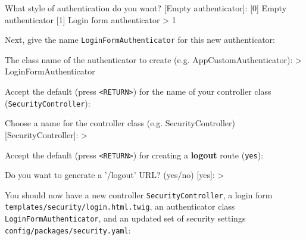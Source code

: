 \documentclass[a4paperpaper,openright]{book}
\newenvironment{Shaded}{}{}
\newcommand{\BuiltInTok}[1]{#1}
\newcommand{\ExtensionTok}[1]{#1}
\newcommand{\NormalTok}[1]{#1}
\newcommand{\OperatorTok}[1]{\textcolor[rgb]{0.40,0.40,0.40}{#1}}
\newcommand{\StringTok}[1]{\textcolor[rgb]{0.25,0.44,0.63}{#1}}
\begin{document}
\begin{Shaded}
\begin{Highlighting}[]
    \ExtensionTok{What}\NormalTok{ style of authentication do you want? [Empty authenticator]:}
\NormalTok{    [}\ExtensionTok{0}\NormalTok{] Empty authenticator}
\NormalTok{    [}\ExtensionTok{1}\NormalTok{] Login form authenticator}
    \OperatorTok{>} \ExtensionTok{1}
\end{Highlighting}
\end{Shaded}

Next, give the name \texttt{LoginFormAuthenticator} for this new
authenticator:

\begin{Shaded}
\begin{Highlighting}[]
    \ExtensionTok{The}\NormalTok{ class name of the authenticator to create (e.g. AppCustomAuthenticator)}\BuiltInTok{:}
    \OperatorTok{>} \ExtensionTok{LoginFormAuthenticator}
\end{Highlighting}
\end{Shaded}

Accept the default (press \texttt{\textless{}RETURN\textgreater{}}) for
the name of your controller class (\texttt{SecurityController}):

\begin{Shaded}
\begin{Highlighting}[]
     \ExtensionTok{Choose}\NormalTok{ a name for the controller class (e.g. SecurityController) [}\ExtensionTok{SecurityController}\NormalTok{]:}
     \OperatorTok{>} 
\end{Highlighting}
\end{Shaded}

Accept the default (press \texttt{\textless{}RETURN\textgreater{}}) for
creating a \textbf{logout} route (\texttt{yes}):

\begin{Shaded}
\begin{Highlighting}[]
     \ExtensionTok{Do}\NormalTok{ you want to generate a }\StringTok{'/logout'}\NormalTok{ URL? (yes/no) [}\ExtensionTok{yes}\NormalTok{]:}
     \OperatorTok{>} 
\end{Highlighting}
\end{Shaded}

You should now have a new controller \texttt{SecurityController}, a
login form \texttt{templates/security/login.html.twig}, an authenticator
class \texttt{LoginFormAuthenticator}, and an updated set of security
settings \texttt{config/packages/security.yaml}:
\end{document}
